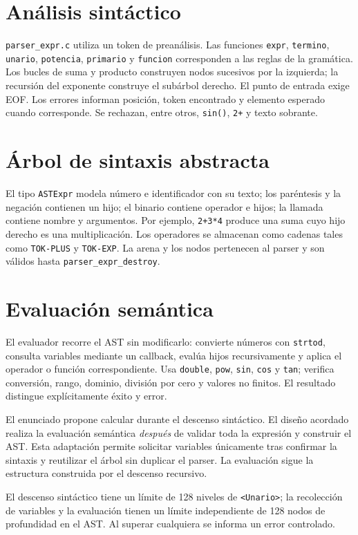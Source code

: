 \documentclass[11pt,a4paper]{article}
\begin{document}
\section{Análisis sintáctico}
\texttt{parser\_expr.c} utiliza un token de preanálisis. Las funciones \texttt{expr}, \texttt{termino}, \texttt{unario}, \texttt{potencia}, \texttt{primario} y \texttt{funcion} corresponden a las reglas de la gramática. Los bucles de suma y producto construyen nodos sucesivos por la izquierda; la recursión del exponente construye el subárbol derecho. El punto de entrada exige EOF. Los errores informan posición, token encontrado y elemento esperado cuando corresponde. Se rechazan, entre otros, \texttt{sin()}, \texttt{2+} y texto sobrante.
\section{Árbol de sintaxis abstracta}
El tipo \texttt{ASTExpr} modela número e identificador con su texto; los paréntesis y la negación contienen un hijo; el binario contiene operador e hijos; la llamada contiene nombre y argumentos. Por ejemplo, \verb|2+3*4| produce una suma cuyo hijo derecho es una multiplicación. Los operadores se almacenan como cadenas tales como \texttt{TOK-PLUS} y \texttt{TOK-EXP}. La arena y los nodos pertenecen al parser y son válidos hasta \texttt{parser\_expr\_destroy}.
\section{Evaluación semántica}
El evaluador recorre el AST sin modificarlo: convierte números con \texttt{strtod}, consulta variables mediante un callback, evalúa hijos recursivamente y aplica el operador o función correspondiente. Usa \texttt{double}, \texttt{pow}, \texttt{sin}, \texttt{cos} y \texttt{tan}; verifica conversión, rango, dominio, división por cero y valores no finitos. El resultado distingue explícitamente éxito y error.

El enunciado propone calcular durante el descenso sintáctico. El diseño acordado realiza la evaluación semántica \emph{después} de validar toda la expresión y construir el AST. Esta adaptación permite solicitar variables únicamente tras confirmar la sintaxis y reutilizar el árbol sin duplicar el parser. La evaluación sigue la estructura construida por el descenso recursivo.

El descenso sintáctico tiene un límite de 128 niveles de \texttt{<Unario>}; la recolección de variables y la evaluación tienen un límite independiente de 128 nodos de profundidad en el AST. Al superar cualquiera se informa un error controlado.
\end{document}
